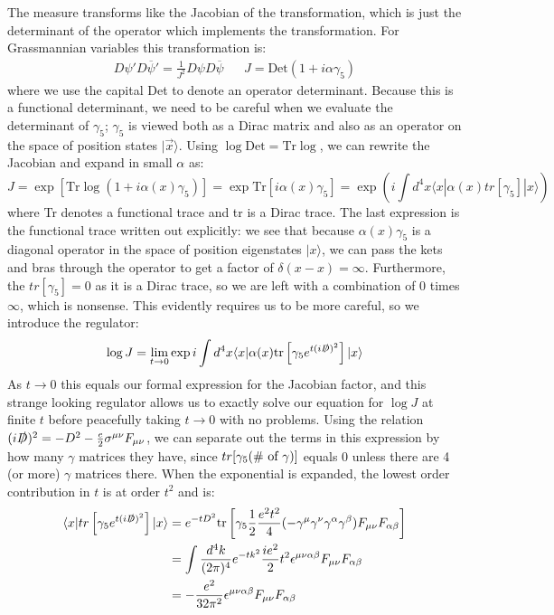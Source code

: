 \documentclass[11pt, oneside]{article}   	%
\theoremstyle{definition}
\numberwithin{equation}{subsection}		%
\begin{document}
The measure transforms like the Jacobian of the transformation, which is just the determinant of the operator which implements the 
transformation. For Grassmannian variables this transformation is:
\begin{align}
	D\psi' D\overline\psi' = \frac{1}{J^2} D\psi D\overline\psi && J = \mathrm{Det}\left(1 + i\alpha\gamma_5\right)
\end{align}
where we use the capital Det to denote an operator determinant. Because this is a functional determinant, we need to be careful when we 
evaluate the determinant of $\gamma_5$; $\gamma_5$ is viewed both as a Dirac matrix and also as an operator on the space of position 
states $|\vec x\rangle$. Using $\log\mathrm{Det} = \mathrm{Tr}\log$, we can rewrite the Jacobian and expand in small $\alpha$ as:
\begin{equation}
	J = \exp\left[\mathrm{Tr}\log \left(1 + i \alpha(x) \gamma_5\right)\right] = \exp\mathrm{Tr}[i\alpha(x)\gamma_5] = \exp\left(i \int d^4 x \langle x | \alpha(x) tr[\gamma_5] | x\rangle\right)
\end{equation}
where Tr denotes a functional trace and tr is a Dirac trace. The last expression is the functional trace written out explicitly: we see that because $\alpha(x)\gamma_5$ is a 
diagonal operator in the space of position eigenstates $|x\rangle$, we can pass the kets and bras through the operator to get a factor of $\delta(x - x) = \infty$. 
Furthermore, the $tr[\gamma_5] = 0$ as it is a Dirac trace, so we are left with a combination of $0$ times $\infty$, which is nonsense. This evidently 
requires us to be more careful, so we introduce the regulator:
\begin{equation}
	\log J = \lim_{t\rightarrow 0} \exp i\int d^4 x \langle x | \alpha(x)\mathrm{tr}\left[\gamma_5 e^{t (i\slashed D)^2}\right] |x\rangle
\end{equation}
As $t\rightarrow 0$ this equals our formal expression for the Jacobian factor, and this strange looking regulator allows us to exactly solve our equation for $\log J$ at 
finite $t$ before peacefully taking $t\rightarrow 0$ with no problems. Using the relation $(i\slashed D)^2 = - D^2 - \frac{e}{2}\sigma^{\mu\nu} F_{\mu\nu}$, we can 
separate out the terms in this expression by how many $\gamma$ matrices they have, since $tr[\gamma_5 (\textnormal{\# of }\gamma)]$ equals 0 unless 
there are 4 (or more) $\gamma$ matrices there. When the exponential is expanded, the lowest order contribution in $t$ is at order $t^2$ and is:
\begin{align}
	\langle x | tr\left[ \gamma_5 e^{t (i\slashed D)^2} \right] | x\rangle &=  e^{-t D^2} \mathrm{tr}\left[\gamma_5 \frac{1}{2} \frac{e^2 t^2}{4} (-\gamma^\mu\gamma^\nu\gamma^\alpha
	\gamma^\beta) F_{\mu\nu} F_{\alpha\beta}\right] \\
	&= \int \frac{d^4 k}{(2\pi)^4} e^{-t k^2} \frac{i e^2}{2} t^2 \epsilon^{\mu\nu\alpha\beta} F_{\mu\nu} F_{\alpha\beta} \\
	&= -\frac{e^2}{32\pi^2} \epsilon^{\mu\nu\alpha\beta} F_{\mu\nu} F_{\alpha\beta}
\end{align}
\end{document}
